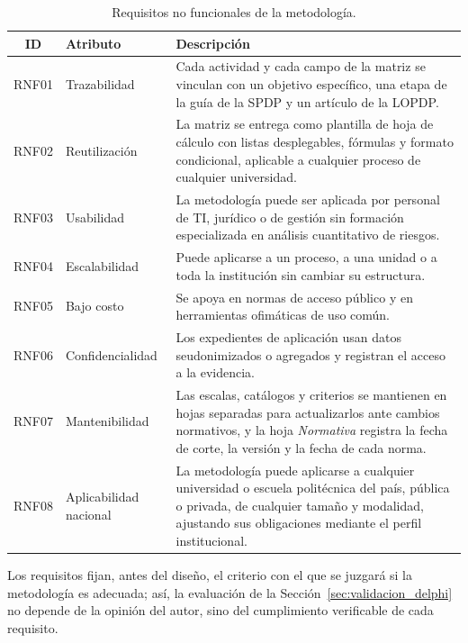 \begin{table}[htbp]
  \centering
  \caption{Requisitos no funcionales de la metodología.}
  \label{tab:rnf}
  \footnotesize
  \renewcommand{\arraystretch}{1.2}
  \begin{tabularx}{\textwidth}{|c|p{2.8cm}|L|}
    \hline
    \textbf{ID} & \textbf{Atributo} & \textbf{Descripción} \\
    \hline
    RNF01 & Trazabilidad & Cada actividad y cada campo de la matriz se vinculan con un objetivo específico, una etapa de la guía de la SPDP y un artículo de la LOPDP. \\
    \hline
    RNF02 & Reutilización & La matriz se entrega como plantilla de hoja de cálculo con listas desplegables, fórmulas y formato condicional, aplicable a cualquier proceso de cualquier universidad. \\
    \hline
    RNF03 & Usabilidad & La metodología puede ser aplicada por personal de TI, jurídico o de gestión sin formación especializada en análisis cuantitativo de riesgos. \\
    \hline
    RNF04 & Escalabilidad & Puede aplicarse a un proceso, a una unidad o a toda la institución sin cambiar su estructura. \\
    \hline
    RNF05 & Bajo costo & Se apoya en normas de acceso público y en herramientas ofimáticas de uso común. \\
    \hline
    RNF06 & Confidencialidad & Los expedientes de aplicación usan datos seudonimizados o agregados y registran el acceso a la evidencia. \\
    \hline
    RNF07 & Mantenibilidad & Las escalas, catálogos y criterios se mantienen en hojas separadas para actualizarlos ante cambios normativos, y la hoja \textit{Normativa} registra la fecha de corte, la versión y la fecha de cada norma. \\
    \hline
    RNF08 & Aplicabilidad nacional & La metodología puede aplicarse a cualquier universidad o escuela politécnica del país, pública o privada, de cualquier tamaño y modalidad, ajustando sus obligaciones mediante el perfil institucional. \\
    \hline
  \end{tabularx}
  \raggedright
\end{table}



Los requisitos fijan, antes del diseño, el criterio con el que se juzgará si la metodología es adecuada; así, la evaluación de la Sección~\ref{sec:validacion_delphi} no depende de la opinión del autor, sino del cumplimiento verificable de cada requisito.

